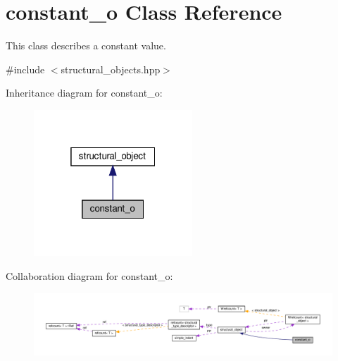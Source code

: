 \hypertarget{classconstant__o}{}\section{constant\+\_\+o Class Reference}
\label{classconstant__o}


This class describes a constant value.  




{\ttfamily \#include $<$structural\+\_\+objects.\+hpp$>$}



Inheritance diagram for constant\+\_\+o\+:
\nopagebreak
\begin{figure}[H]
\begin{center}
\leavevmode
\includegraphics[width=169pt]{d2/da6/classconstant__o__inherit__graph}
\end{center}
\end{figure}


Collaboration diagram for constant\+\_\+o\+:
\nopagebreak
\begin{figure}[H]
\begin{center}
\leavevmode
\includegraphics[width=350pt]{dd/dd0/classconstant__o__coll__graph}
\end{center}
\end{figure}
